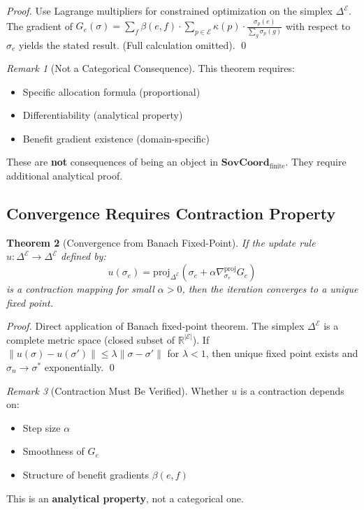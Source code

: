 \documentclass[11pt,a4paper]{article}
\newtheorem{theorem}{Theorem}[section]
\theoremstyle{definition}
\theoremstyle{remark}
\newtheorem{remark}[theorem]{Remark}
\newcommand{\E}{\mathcal{E}}
\newcommand{\SovCoord}{\mathbf{SovCoord}}
\begin{document}
\begin{proof}
Use Lagrange multipliers for constrained optimization on the simplex $\Delta^{\E}$. The gradient of $G_e(\sigma) = \sum_f \beta(e,f) \cdot \sum_{p \in \E} \kappa(p) \cdot \frac{\sigma_p(e)}{\sum_g \sigma_p(g)}$ with respect to $\sigma_e$ yields the stated result. (Full calculation omitted). \qed
\end{proof}

\begin{remark}[Not a Categorical Consequence]
This theorem requires:
\begin{itemize}
\item Specific allocation formula (proportional)
\item Differentiability (analytical property)
\item Benefit gradient existence (domain-specific)
\end{itemize}
These are \textbf{not} consequences of being an object in $\SovCoord_{\text{finite}}$. They require additional analytical proof.
\end{remark}

\subsection{Convergence Requires Contraction Property}

\begin{theorem}[Convergence from Banach Fixed-Point]
\label{thm:convergence}
If the update rule $u: \Delta^{\E} \to \Delta^{\E}$ defined by:
\[ u(\sigma_e) = \text{proj}_{\Delta^{\E}}\left(\sigma_e + \alpha \nabla_{\sigma_e}^{\text{proj}} G_e\right) \]
is a contraction mapping for small $\alpha > 0$, then the iteration converges to a unique fixed point.
\end{theorem}

\begin{proof}
Direct application of Banach fixed-point theorem. The simplex $\Delta^{\E}$ is a complete metric space (closed subset of $\mathbb{R}^{|\E|}$). If $\|u(\sigma) - u(\sigma')\| \leq \lambda \|\sigma - \sigma'\|$ for $\lambda < 1$, then unique fixed point exists and $\sigma_n \to \sigma^*$ exponentially. \qed
\end{proof}

\begin{remark}[Contraction Must Be Verified]
Whether $u$ is a contraction depends on:
\begin{itemize}
\item Step size $\alpha$
\item Smoothness of $G_e$
\item Structure of benefit gradients $\beta(e,f)$
\end{itemize}
This is an \textbf{analytical property}, not a categorical one.
\end{remark}
\end{document}
